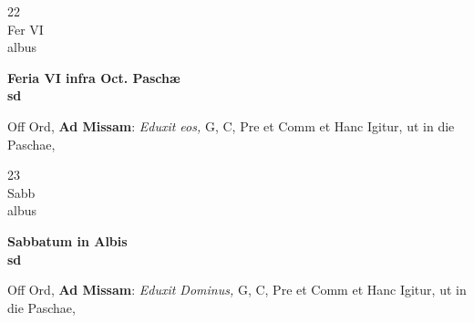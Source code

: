 \documentclass[10pt, openany]{book}
\begin{document}
        \begin{center}
            \begin{minipage}{3.5in}
                \vspace{2em}
                \begin{minipage}{0.5in}
                    {\Huge 22} \\
                    {\normalsize Fer VI} \\
                    {\normalsize albus}
                \end{minipage}
                \begin{minipage}{3.0in}
                    \textbf{ \large Feria VI infra Oct. Paschæ \\
                    \textnormal{\normalsize sd}} \\ 
                \end{minipage}
                \begin{justify}Off Ord, \textbf{Ad Missam}: \textit{Eduxit eos,} G, C, Pre et Comm et Hanc Igitur, ut in die Paschae,   
                \end{justify}
            \end{minipage}
        \end{center}
    
        \begin{center}
            \begin{minipage}{3.5in}
                \vspace{2em}
                \begin{minipage}{0.5in}
                    {\Huge 23} \\
                    {\normalsize Sabb} \\
                    {\normalsize albus}
                \end{minipage}
                \begin{minipage}{3.0in}
                    \textbf{ \large Sabbatum in Albis \\
                    \textnormal{\normalsize sd}} \\ 
                \end{minipage}
                \begin{justify}Off Ord, \textbf{Ad Missam}: \textit{Eduxit Dominus,} G, C, Pre et Comm et Hanc Igitur, ut in die Paschae,   
                \end{justify}
            \end{minipage}
        \end{center}
    
\end{document}
